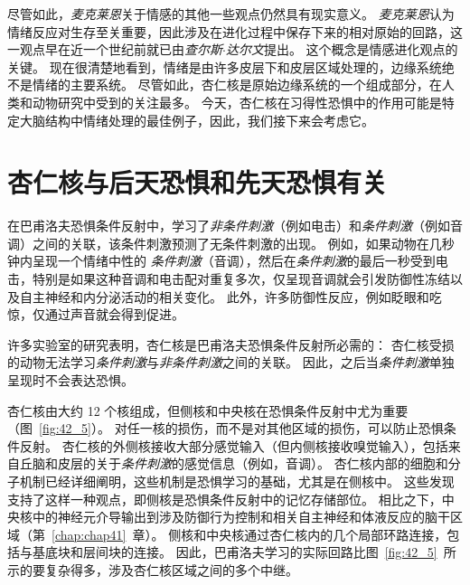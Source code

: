 尽管如此，\textit{麦克莱恩}关于情感的其他一些观点仍然具有现实意义。
\textit{麦克莱恩}认为情绪反应对生存至关重要，因此涉及在进化过程中保存下来的相对原始的回路，这一观点早在近一个世纪前就已由\textit{查尔斯$\cdot$达尔文}提出。
这个概念是情感进化观点的关键。
现在很清楚地看到，情绪是由许多皮层下和皮层区域处理的，边缘系统绝不是情绪的主要系统。
尽管如此，杏仁核是原始边缘系统的一个组成部分，在人类和动物研究中受到的关注最多。
今天，杏仁核在习得性恐惧中的作用可能是特定大脑结构中情绪处理的最佳例子，因此，我们接下来会考虑它。



\section{杏仁核与后天恐惧和先天恐惧有关}

在巴甫洛夫恐惧条件反射中，学习了\textit{非条件刺激}（例如电击）和\textit{条件刺激}（例如音调）之间的关联，该条件刺激预测了无条件刺激的出现。
例如，如果动物在几秒钟内呈现一个情绪中性的 \textit{条件刺激}（音调），然后在\textit{条件刺激}的最后一秒受到电击，特别是如果这种音调和电击配对重复多次，仅呈现音调就会引发防御性冻结以及自主神经和内分泌活动的相关变化。
此外，许多防御性反应，例如眨眼和吃惊，仅通过声音就会得到促进。


许多实验室的研究表明，杏仁核是巴甫洛夫恐惧条件反射所必需的：
杏仁核受损的动物无法学习\textit{条件刺激}与\textit{非条件刺激}之间的关联。
因此，之后当\textit{条件刺激}单独呈现时不会表达恐惧。


杏仁核由大约 12 个核组成，但侧核和中央核在恐惧条件反射中尤为重要（图~\ref{fig:42_5}）。
对任一核的损伤，而不是对其他区域的损伤，可以防止恐惧条件反射。
杏仁核的外侧核接收大部分感觉输入（但内侧核接收嗅觉输入），包括来自丘脑和皮层的关于\textit{条件刺激}的感觉信息（例如，音调）。
杏仁核内部的细胞和分子机制已经详细阐明，这些机制是恐惧学习的基础，尤其是在侧核中。
这些发现支持了这样一种观点，即侧核是恐惧条件反射中的记忆存储部位。
相比之下，中央核中的神经元介导输出到涉及防御行为控制和相关自主神经和体液反应的脑干区域（第~\ref{chap:chap41}~章）。
侧核和中央核通过杏仁核内的几个局部环路连接，包括与基底块和层间块的连接。
因此，巴甫洛夫学习的实际回路比图~\ref{fig:42_5}~所示的要复杂得多，涉及杏仁核区域之间的多个中继。


